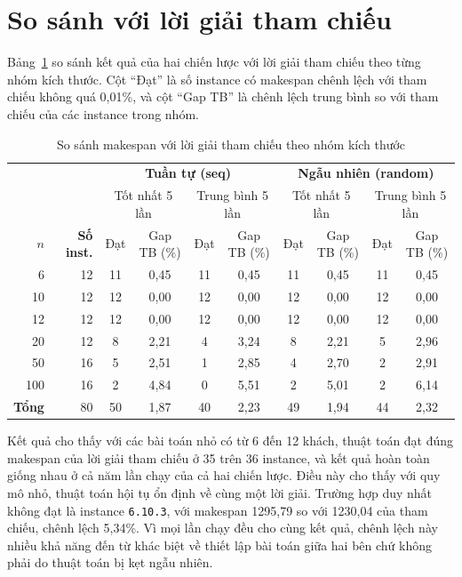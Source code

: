 \documentclass[../DoAn.tex]{subfiles}
\begin{document}
\section{So sánh với lời giải tham chiếu}
\label{sec:exp_ref}

Bảng~\ref{tab:ref} so sánh kết quả của hai chiến lược với lời giải tham chiếu theo từng nhóm kích thước. Cột ``Đạt'' là số instance có makespan chênh lệch với tham chiếu không quá 0,01\%, và cột ``Gap TB'' là chênh lệch trung bình so với tham chiếu của các instance trong nhóm.

\begin{table}[H]
\centering
\caption{So sánh makespan với lời giải tham chiếu theo nhóm kích thước}
\label{tab:ref}
\begin{tabular}{rr|cc|cc|cc|cc}
\toprule
 & & \multicolumn{4}{c|}{\textbf{Tuần tự (seq)}} & \multicolumn{4}{c}{\textbf{Ngẫu nhiên (random)}} \\
 & & \multicolumn{2}{c|}{Tốt nhất 5 lần} & \multicolumn{2}{c|}{Trung bình 5 lần} & \multicolumn{2}{c|}{Tốt nhất 5 lần} & \multicolumn{2}{c}{Trung bình 5 lần} \\
$n$ & \textbf{Số inst.} & Đạt & Gap TB (\%) & Đạt & Gap TB (\%) & Đạt & Gap TB (\%) & Đạt & Gap TB (\%) \\
\midrule
6   & 12 & 11 & 0,45 & 11 & 0,45 & 11 & 0,45 & 11 & 0,45 \\
10  & 12 & 12 & 0,00 & 12 & 0,00 & 12 & 0,00 & 12 & 0,00 \\
12  & 12 & 12 & 0,00 & 12 & 0,00 & 12 & 0,00 & 12 & 0,00 \\
20  & 12 &  8 & 2,21 &  4 & 3,24 &  8 & 2,21 &  5 & 2,96 \\
50  & 16 &  5 & 2,51 &  1 & 2,85 &  4 & 2,70 &  2 & 2,91 \\
100 & 16 &  2 & 4,84 &  0 & 5,51 &  2 & 5,01 &  2 & 6,14 \\
\midrule
\textbf{Tổng} & 80 & 50 & 1,87 & 40 & 2,23 & 49 & 1,94 & 44 & 2,32 \\
\bottomrule
\end{tabular}
\end{table}

Kết quả cho thấy với các bài toán nhỏ có từ 6 đến 12 khách, thuật toán đạt đúng makespan của lời giải tham chiếu ở 35 trên 36 instance, và kết quả hoàn toàn giống nhau ở cả năm lần chạy của cả hai chiến lược. Điều này cho thấy với quy mô nhỏ, thuật toán hội tụ ổn định về cùng một lời giải. Trường hợp duy nhất không đạt là instance \texttt{6.10.3}, với makespan 1295,79 so với 1230,04 của tham chiếu, chênh lệch 5,34\%. Vì mọi lần chạy đều cho cùng kết quả, chênh lệch này nhiều khả năng đến từ khác biệt về thiết lập bài toán giữa hai bên chứ không phải do thuật toán bị kẹt ngẫu nhiên.
\end{document}
